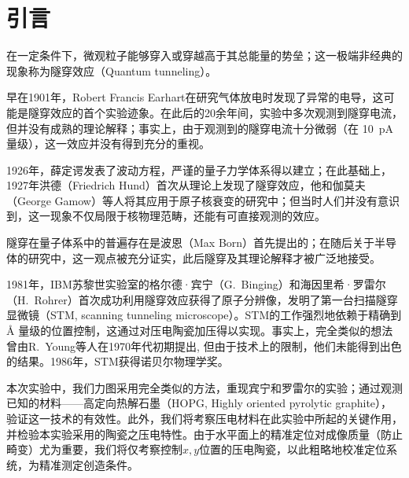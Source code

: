 \documentclass[a4paper]{article}
\begin{document}
\newpage
\begin{center}
\tableofcontents\label{c}
\end{center}
\newpage

\section{引言} \label{overview}%
在一定条件下，微观粒子能够穿入或穿越高于其总能量的势垒；这一极端非经典的现象称为隧穿效应（Quantum tunneling）。
	
早在1901年，Robert Francis Earhart在研究气体放电时发现了异常的电导，这可能是隧穿效应的首个实验迹象。在此后的20余年间，实验中多次观测到隧穿电流，但并没有成熟的理论解释；事实上，由于观测到的隧穿电流十分微弱（在 \SI{10}{\pA} 量级），这一效应并没有得到充分的重视\supercite{mohsen2003quantum}。
	
1926年，薛定谔发表了波动方程，严谨的量子力学体系得以建立；在此基础上，1927年洪德（Friedrich Hund）首次从理论上发现了隧穿效应，他和伽莫夫（George Gamow）等人将其应用于原子核衰变的研究中；但当时人们并没有意识到，这一现象不仅局限于核物理范畴，还能有可直接观测的效应\supercite{mohsen2003quantum}。
	
隧穿在量子体系中的普遍存在是波恩（Max Born）首先提出的；在随后关于半导体的研究中，这一观点被充分证实，此后隧穿及其理论解释才被广泛地接受\supercite{mohsen2003quantum}。
	
1981年，IBM苏黎世实验室的格尔德·宾宁（G.~Binging）和海因里希·罗雷尔（H.~Rohrer）首次成功利用隧穿效应获得了原子分辨像，发明了第一台扫描隧穿显微镜（STM, scanning tunneling microscope）。STM的工作强烈地依赖于精确到 \si{\angstrom} 量级的位置控制，这通过对压电陶瓷加压得以实现。事实上，完全类似的想法曾由R.~Young等人在1970年代初期提出, 但由于技术上的限制，他们未能得到出色的结果。1986年，STM获得诺贝尔物理学奖。
	
本次实验中，我们力图采用完全类似的方法，重现宾宁和罗雷尔的实验；通过观测已知的材料——高定向热解石墨（HOPG, Highly oriented pyrolytic graphite），验证这一技术的有效性。此外，我们将考察压电材料在此实验中所起的关键作用，并检验本实验采用的陶瓷之压电特性。由于水平面上的精准定位对成像质量（防止畸变）尤为重要，我们将仅考察控制$x,y$位置的压电陶瓷，以此粗略地校准定位系统，为精准测定创造条件。

\newpage
\end{document}
